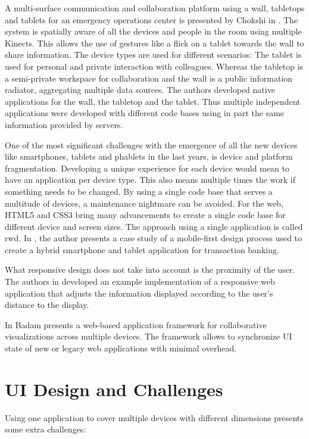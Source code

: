 \documentclass{sigchi}
\begin{document}
A multi-surface communication and collaboration platform using a wall, tabletops and tablets for an emergency operations center is presented by Chokshi in \cite{Chokshi:2014:EMM:2669485.2669520}. 
The system is spatially aware of all the devices and people in the room using multiple Kinects.
This allows the use of gestures like a flick on a tablet towards the wall to share information.
The device types are used for different scenarios:
The tablet is used for personal and private interaction with colleagues.
Whereas the tabletop is a semi-private workspace for collaboration and the wall is a public information radiator, aggregating multiple data sources.
The authors developed native applications for the wall, the tabletop and the tablet.
Thus multiple independent applications were developed with different code bases using in part the same information provided by servers.

One of the most significant challenges with the emergence of all the new devices like smartphones, tablets and phablets in the last years, is device and platform fragmentation.
Developing a unique experience for each device would mean to have an application per device type.
This also means multiple times the work if something needs to be changed. 
By using a single code base that serves a multitude of devices, a maintenance nightmare can be avoided.
For the web, HTML5 and CSS3 bring many advancements to create a single code base for different device and screen sizes.
The approach using a single application is called \gls{rwd}.
In \cite{Pandey:2013:RDT:2525194.2525271}, the author presents a case study of a mobile-first design process used to create a hybrid smartphone and tablet application for transaction banking.

What responsive design does not take into account is the proximity of the user. 
The authors in \cite{Sukale:2014:PWD:2638728.2638768} developed an example implementation of a responsive web application that adjusts the information displayed according to the user's distance to the display.

In \cite{Badam:2014:PCF:2669485.2669518} Badam presents a web-based application framework for collaborative visualizations across multiple devices. The framework allows to synchronize UI state of new or legacy web applications with minimal overhead.


\section{UI Design and Challenges}
Using one application to cover multiple devices with different dimensions presents some extra challenges:
\end{document}
